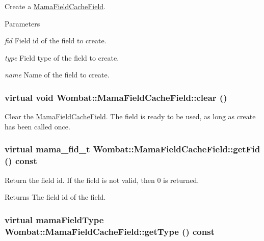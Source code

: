 Create a \hyperlink{classWombat_1_1MamaFieldCacheField}{MamaFieldCacheField}. 
\begin{DoxyParams}{Parameters}
\item[{\em fid}]Field id of the field to create. \item[{\em type}]Field type of the field to create. \item[{\em name}]Name of the field to create. \end{DoxyParams}
\hypertarget{classWombat_1_1MamaFieldCacheField_a7ecde23453694bc6dfe4c92b38390588}{
\subsubsection[{clear}]{\setlength{\rightskip}{0pt plus 5cm}virtual void Wombat::MamaFieldCacheField::clear ()}}
\label{classWombat_1_1MamaFieldCacheField_a7ecde23453694bc6dfe4c92b38390588}


Clear the {\ttfamily \hyperlink{classWombat_1_1MamaFieldCacheField}{MamaFieldCacheField}}. The field is ready to be used, as long as create has been called once. \hypertarget{classWombat_1_1MamaFieldCacheField_a981ff23033f7d225f2b39e442df9dfa0}{
\subsubsection[{getFid}]{\setlength{\rightskip}{0pt plus 5cm}virtual mama\_\-fid\_\-t Wombat::MamaFieldCacheField::getFid () const}}
\label{classWombat_1_1MamaFieldCacheField_a981ff23033f7d225f2b39e442df9dfa0}


Return the field id. If the field is not valid, then 0 is returned.

\begin{DoxyReturn}{Returns}
The field id of the field. 
\end{DoxyReturn}
\hypertarget{classWombat_1_1MamaFieldCacheField_a72b0f438fc565c0a4fdf2c47b153f965}{
\subsubsection[{getType}]{\setlength{\rightskip}{0pt plus 5cm}virtual mamaFieldType Wombat::MamaFieldCacheField::getType () const}}
\label{classWombat_1_1MamaFieldCacheField_a72b0f438fc565c0a4fdf2c47b153f965}


